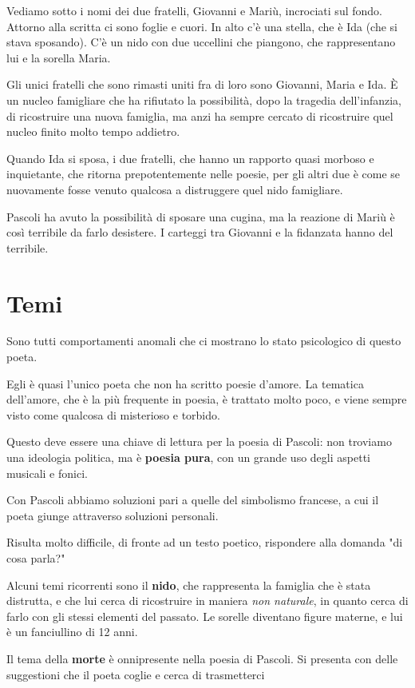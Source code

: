 \documentclass[a4paper, twoside, titlepage]{book}
\begin{document}
Vediamo sotto i nomi dei due fratelli, Giovanni e Mariù, incrociati sul fondo.
Attorno alla scritta ci sono foglie e cuori.
In alto c'è una stella, che è Ida (che si stava sposando).
C'è un nido con due uccellini che piangono, che rappresentano lui e la sorella Maria.

Gli unici fratelli che sono rimasti uniti fra di loro sono Giovanni, Maria e Ida.
È un nucleo famigliare che ha rifiutato la possibilità, dopo la tragedia dell'infanzia, di ricostruire una nuova famiglia, ma anzi ha sempre cercato di ricostruire quel nucleo finito molto tempo addietro.

Quando Ida si sposa, i due fratelli, che hanno un rapporto quasi morboso e inquietante, che ritorna prepotentemente nelle poesie, per gli altri due è come se nuovamente fosse venuto qualcosa a distruggere quel nido famigliare.

Pascoli ha avuto la possibilità di sposare una cugina, ma la reazione di Mariù è così terribile da farlo desistere. I carteggi tra Giovanni e la fidanzata hanno del terribile.

\section{Temi}

Sono tutti comportamenti anomali che ci mostrano lo stato psicologico di questo poeta.

Egli è quasi l'unico poeta che non ha scritto poesie d'amore. La tematica dell'amore, che è la più frequente in poesia, è trattato molto poco, e viene sempre visto come qualcosa di misterioso e torbido.

Questo deve essere una chiave di lettura per la poesia di Pascoli: non troviamo una ideologia politica, ma è \textbf{poesia pura}, con un grande uso degli aspetti musicali e fonici.

Con Pascoli abbiamo soluzioni pari a quelle del simbolismo francese, a cui il poeta giunge attraverso soluzioni personali.

Risulta molto difficile, di fronte ad un testo poetico, rispondere alla domanda "di cosa parla?"

Alcuni temi ricorrenti sono il \textbf{nido}, che rappresenta la famiglia che è stata distrutta, e che lui cerca di ricostruire in maniera \textit{non naturale}, in quanto cerca di farlo con gli stessi elementi del passato. Le sorelle diventano figure materne, e lui è un fanciullino di 12 anni.

Il tema della \textbf{morte} è onnipresente nella poesia di Pascoli. Si presenta con delle suggestioni che il poeta coglie e cerca di trasmetterci
\end{document}
